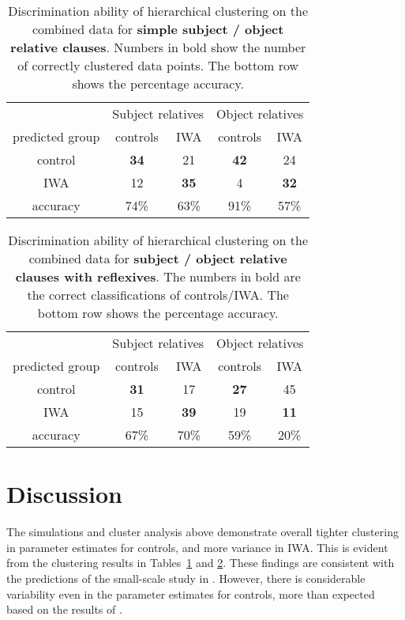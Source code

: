 \documentclass[10pt,letterpaper]{article}
\begin{document}
\begin{table}
\begin{tabular}{ccccc}
 &\multicolumn{2}{c}{Subject relatives} & \multicolumn{2}{c}{Object relatives}\\
predicted group &    controls &  IWA & controls & IWA \\ 
         control      &  \textbf{34}             & 21   &        \textbf{42}   & 24\\
         IWA           & 12              & \textbf{35}    &         4    & \textbf{32}\\ 
 \hline        
         accuracy & 74\% & 63\% & 91\% & 57\%
\end{tabular}
\caption{Discrimination ability of hierarchical clustering on the combined data for \textbf{simple subject / object relative clauses}. Numbers in bold show the number of correctly clustered data points. The bottom row shows the percentage accuracy.}
  \label{table:hclustSO}
\end{table}

\begin{table}
  \begin{tabular}{ccccc}
 &\multicolumn{2}{c}{Subject relatives} & \multicolumn{2}{c}{Object relatives}\\
predicted group &    controls &  IWA & controls & IWA \\ 
         control      &  \textbf{31}             & 17   &        \textbf{27}   & 45\\
         IWA           & 15              & \textbf{39}    &         19    & \textbf{11}\\ 
 \hline        
         accuracy & 67\% & 70\% & 59\% & 20\%
\end{tabular}
\caption{Discrimination ability of hierarchical clustering on the combined data for \textbf{subject / object relative clauses with reflexives}. The numbers in bold are the correct classifications of controls/IWA. The bottom row shows the percentage accuracy.}
  \label{table:hclustSOREF}
\end{table}

\section{Discussion}

The simulations and cluster analysis above demonstrate overall tighter clustering in parameter estimates for controls, and more variance in IWA. This is evident from the clustering results in Tables~\ref{table:hclustSO} and \ref{table:hclustSOREF}.
These findings are consistent with the predictions of the small-scale study in . However, there is considerable variability even in the parameter estimates for controls, more than expected based on the results of .
\end{document}
